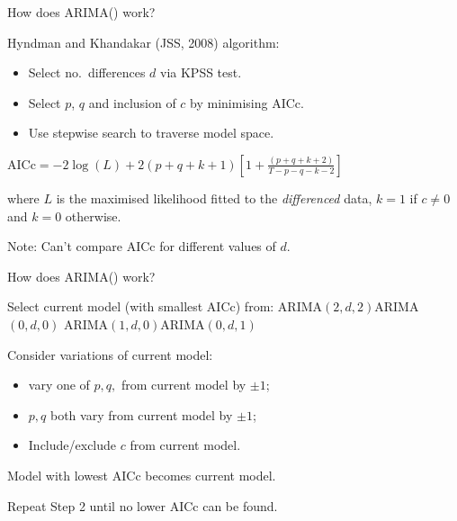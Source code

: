 \documentclass[
  14pt,
  ignorenonframetext,
  aspectratio=169,
]{beamer}
\providecommand{\tightlist}{%
  \setlength{\itemsep}{0pt}\setlength{\parskip}{0pt}}
\begin{document}
\begin{frame}{How does ARIMA() work?}
\protect{}\label{how-does-arima-work}
\begin{alertblock}{Hyndman and Khandakar (JSS, 2008) algorithm:}
\begin{itemize}\tightlist
\item Select no.\ differences $d$ via KPSS test.
\item Select $p$, $q$ and inclusion of $c$ by minimising AICc.
\item Use stepwise search to traverse model space.
\end{itemize}
\end{alertblock}\pause

\begin{block}{}
\centerline{$\displaystyle \text{AICc} = -2 \log(L) + 2(p+q+k+1)\left[1 + \frac{(p+q+k+2)}{T-p-q-k-2}\right]$}
where $L$ is the maximised likelihood fitted to the \textit{differenced} data,
$k=1$ if $c\neq 0$ and $k=0$ otherwise.\pause
\end{block}

Note: Can't compare AICc for different values of \(d\).
\end{frame}

\begin{frame}{How does ARIMA() work?}
\protect{}\label{how-does-arima-work-1}
\fontsize{12.5}{14.5}\sf

\begin{description}
\tightlist
\item[Step1:]
Select current model (with smallest AICc) from:\newline
ARIMA\((2,d,2)\)\newline ARIMA\((0,d,0)\)\newline
ARIMA\((1,d,0)\)\newline ARIMA\((0,d,1)\) \pause\vspace*{-0.1cm}
\item[Step 2:]
Consider variations of current model:

\begin{itemize}
\tightlist
\item
  vary one of \(p,q,\) from current model by \(\pm1\);
\item
  \(p,q\) both vary from current model by \(\pm1\);
\item
  Include/exclude \(c\) from current model.
\end{itemize}

Model with lowest AICc becomes current model.
\end{description}

\pause\alert{Repeat Step 2 until no lower AICc can be found.}
\end{frame}
\end{document}
